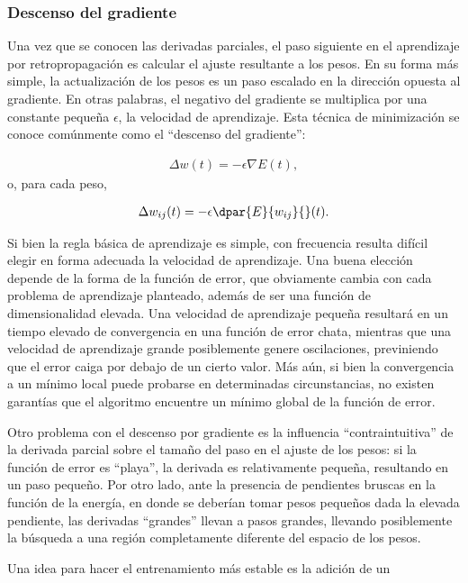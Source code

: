 \subsubsection{Descenso del gradiente}
Una vez que se conocen las derivadas parciales, el paso siguiente en
el aprendizaje por retropropagación es calcular el ajuste resultante a
los pesos. En su forma más simple, la actualización de los pesos es un
paso escalado en la dirección opuesta al gradiente.  En otras
palabras, el negativo del gradiente se multiplica por una constante
pequeña $\epsilon$, la velocidad de aprendizaje. Esta técnica de
minimización se conoce comúnmente como el ``descenso del gradiente'':

\begin{align}
\label{mlp6}
  \Delta w(t) = - \epsilon \nabla E(t),
\end{align}
o, para cada peso,

\begin{align}
\label{mlp6}
  \Delta w_{ij}(t) = - \epsilon \dpar{E}{w_{ij}}{}(t).
\end{align}

Si bien la regla básica de aprendizaje es simple, con frecuencia
resulta difícil elegir en forma adecuada la velocidad de
aprendizaje. Una buena elección depende de la forma de la función de
error, que obviamente cambia con cada problema de aprendizaje
planteado, además de ser una función de dimensionalidad elevada.  Una
velocidad de aprendizaje pequeña resultará en un tiempo elevado de
convergencia en una función de error chata, mientras que una velocidad
de aprendizaje grande posiblemente genere oscilaciones, previniendo
que el error caiga por debajo de un cierto valor.  Más aún, si bien la
convergencia a un mínimo local puede probarse en determinadas
circunstancias, no existen garantías que el algoritmo encuentre un
mínimo global de la función de error.

Otro problema con el descenso por gradiente es la influencia
``contraintuitiva'' de la derivada parcial sobre el tamaño del paso en
el ajuste de los pesos: si la función de error es ``playa'', la
derivada es relativamente pequeña, resultando en un paso pequeño.  Por
otro lado, ante la presencia de pendientes bruscas en la función de
la energía, en donde se deberían tomar pesos pequeños dada la
elevada pendiente, las derivadas ``grandes'' llevan a pasos grandes,
llevando posiblemente la búsqueda a una región completamente diferente
del espacio de los pesos.

Una idea para hacer el entrenamiento más estable es la adición de un


